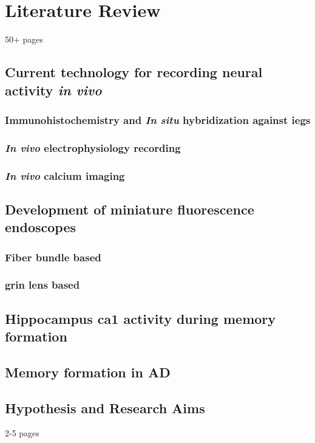 \chapter{Literature Review}
50+ pages

\section{Current technology for recording neural activity \textit{in vivo}}
\subsection{Immunohistochemistry and \textit{In situ} hybridization against \glspl{ieg}}
\subsection{\textit{In vivo} electrophysiology recording}
\subsection{\textit{In vivo} calcium imaging}

\section{Development of miniature fluorescence endoscopes}
\subsection{Fiber bundle based}
\subsection{\gls{grin} lens based}

\section{Hippocampus \gls{ca1} activity during memory formation}

\section{Memory formation in \gls{AD}}

\section{Hypothesis and Research Aims}
2-5 pages
